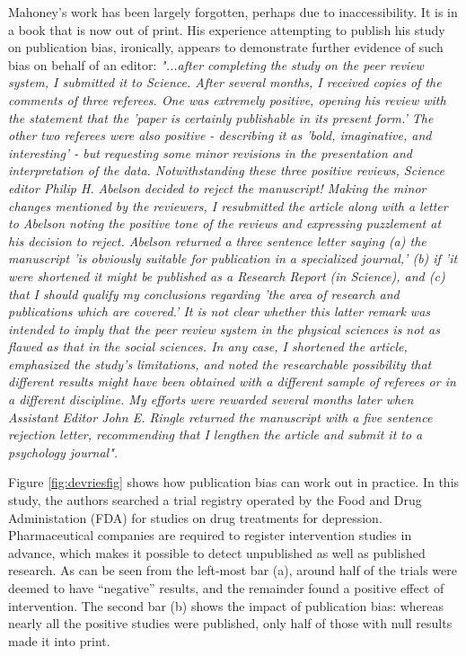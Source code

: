\documentclass{krantz}
\begin{document}
\begin{tcolorbox}[colback=Black!5!lightgray,colframe=black!75!black,coltitle=white,title=Michael Mahoney: A man ahead of his time]\label{box:Mahoney}
Mahoney's work has been largely forgotten, perhaps due to inaccessibility. It is in a book that is now out of print. His experience attempting to publish his study on publication bias, ironically, appears to demonstrate further evidence of such bias on behalf of an editor:
\textit{"...after completing the study on the peer review system, I submitted it to Science. After several months, I received copies of the comments of three referees. One was extremely positive, opening his review with the statement that the 'paper is certainly publishable in its present form.' The other two referees were also positive - describing it as 'bold, imaginative, and interesting' - but requesting some minor revisions in the presentation and interpretation of the data. Notwithstanding these three positive reviews, Science editor Philip H. Abelson decided to reject the manuscript! Making the minor changes mentioned by the reviewers, I resubmitted the article along with a letter to Abelson noting the positive tone of the reviews and expressing puzzlement at his decision to reject. Abelson returned a three sentence letter saying (a) the manuscript 'is obviously suitable for publication in a specialized journal,' (b) if 'it were shortened it might be published as a Research Report (in Science), and (c) that I should qualify my conclusions regarding 'the area of research and publications which are covered.' It is not clear whether this latter remark was intended to imply that the peer review system in the physical sciences is not as flawed as that in the social sciences. In any case, I shortened the article, emphasized the study's limitations, and noted the researchable possibility that different results might have been obtained with a different sample of referees or in a different discipline. My efforts were rewarded several months later when Assistant Editor John E. Ringle returned the manuscript with a five sentence rejection letter, recommending that I lengthen the article and submit it to a psychology journal".}

\end{tcolorbox}

Figure \ref{fig:devriesfig} shows how publication bias can work out in practice. In this study, the authors searched a trial registry operated by the Food and Drug Administation (FDA) for studies on drug treatments for depression. Pharmaceutical companies are required to register intervention studies in advance, which makes it possible to detect unpublished as well as published research. As can be seen from the left-most bar (a), around half of the trials were deemed to have ``negative'' results, and the remainder found a positive effect of intervention. The second bar (b) shows the impact of publication bias: whereas nearly all the positive studies were published, only half of those with null results made it into print.
\end{document}
